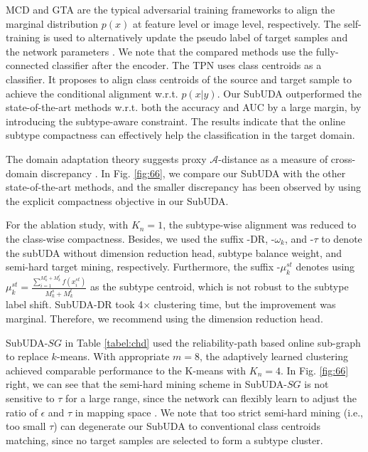 MCD \cite{saito2017maximum} and GTA \cite{sankaranarayanan2018generate} are the typical adversarial training frameworks to align the marginal distribution $p(x)$ at feature level or image level, respectively. The self-training is used to alternatively update the pseudo label of target samples and the network parameters \cite{zou2019confidence}. We note that the compared methods \cite{saito2017maximum,sankaranarayanan2018generate,zou2019confidence,wu2020dual} use the fully-connected classifier after the encoder. The TPN \cite{pan2019transferrable} uses class centroids as a classifier. It proposes to align class centroids of the source and target sample to achieve the conditional alignment w.r.t. $p(x|y)$. Our SubUDA outperformed the state-of-the-art methods w.r.t. both the accuracy and AUC by a large margin, by introducing the subtype-aware constraint. The results indicate that the online subtype compactness can effectively help the classification in the target domain.

The domain adaptation theory suggests proxy $\mathcal{A}$-distance \cite{ben2007analysis} as a measure of cross-domain discrepancy \cite{saito2017asymmetric}. In Fig. \ref{fig:66}, we compare our SubUDA with the other state-of-the-art methods, and the smaller discrepancy has been observed by using the explicit compactness objective in our SubUDA.

For the ablation study, with $K_n=1$, the subtype-wise alignment was reduced to the class-wise compactness. Besides, we used the suffix -DR, -$\omega_k$, and -$\tau$ to denote the subUDA without dimension reduction head, subtype balance weight, and semi-hard target mining, respectively. Furthermore, the suffix -$\mu_k^{st}$ denotes using $\mu_k^{st}=\frac{\sum_{i=1}^{M_k^s+M_k^t}f(x_i^{st})}{M_k^s+M_k^t}$ as the subtype centroid, which is not robust to the subtype label shift. SubUDA-DR took 4$\times$ clustering time, but the improvement was marginal. Therefore, we recommend using the dimension reduction head. 


 
 
SubUDA-$SG$ in Table \ref{tabel:chd} used the reliability-path based online sub-graph to replace $k$-means. With appropriate $m=8$, the adaptively learned clustering achieved comparable performance to the K-means with $K_n=4$. In Fig. \ref{fig:66} right, we can see that the semi-hard mining scheme in SubUDA-$SG$ is not sensitive to $\tau$ for a large range, since the network can flexibly learn to adjust the ratio of $\epsilon$ and $\tau$ in mapping space \cite{liu2017adaptive}. We note that too strict semi-hard mining (i.e., too small $\tau$) can degenerate our SubUDA to conventional class centroids matching, since no target samples are selected to form a subtype cluster.



